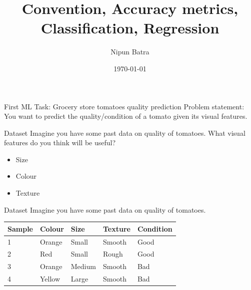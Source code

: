 \documentclass[usenames,dvipsnames]{beamer}
\title{Convention, Accuracy metrics, Classification, Regression}
\date{\today}
\author{Nipun Batra}
\institute{IIT Gandhinagar}
\begin{document}
  \maketitle
  
  
  



\begin{frame}{First ML Task: Grocery store tomatoes quality prediction}
Problem statement: You want to predict the quality/condition of a tomato given its visual features.
\end{frame}

\begin{frame}{Dataset}
Imagine you have some past data on quality of tomatoes. What visual features do you think will be useful?

\begin{itemize}
	\item Size
	\item Colour
	\item Texture
\end{itemize}
\end{frame}
  
\begin{frame}{Dataset}
Imagine you have some past data on quality of tomatoes. 

\begin{table}[]
	\begin{tabular}{|l|l|l|l||l|}
		\hline 
		\textbf{Sample} & \textbf{Colour} & \textbf{Size} & \textbf{Texture} & \textbf{Condition} \\ \hline 
		1      & Orange & Small & Smooth  & Good      \\
		2      & Red    & Small  & Rough  & Good \\
		3      & Orange & Medium & Smooth & Bad \\
		4      & Yellow & Large  & Smooth & Bad \\ \hline          
	\end{tabular}
\end{table}
\end{frame}
\end{document}
